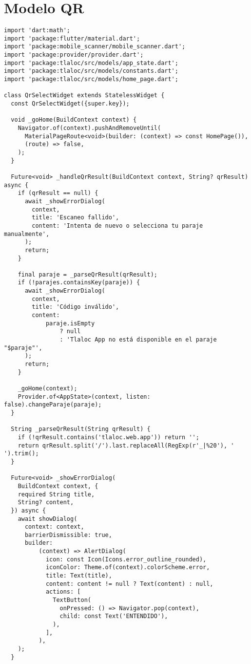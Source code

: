 \section{Modelo QR}
\label{anexo:alg11}
\begin{verbatim}
import 'dart:math';
import 'package:flutter/material.dart';
import 'package:mobile_scanner/mobile_scanner.dart';
import 'package:provider/provider.dart';
import 'package:tlaloc/src/models/app_state.dart';
import 'package:tlaloc/src/models/constants.dart';
import 'package:tlaloc/src/models/home_page.dart';

class QrSelectWidget extends StatelessWidget {
  const QrSelectWidget({super.key});

  void _goHome(BuildContext context) {
    Navigator.of(context).pushAndRemoveUntil(
      MaterialPageRoute<void>(builder: (context) => const HomePage()),
      (route) => false,
    );
  }

  Future<void> _handleQrResult(BuildContext context, String? qrResult) async {
    if (qrResult == null) {
      await _showErrorDialog(
        context,
        title: 'Escaneo fallido',
        content: 'Intenta de nuevo o selecciona tu paraje manualmente',
      );
      return;
    }

    final paraje = _parseQrResult(qrResult);
    if (!parajes.containsKey(paraje)) {
      await _showErrorDialog(
        context,
        title: 'Código inválido',
        content:
            paraje.isEmpty
                ? null
                : 'Tlaloc App no está disponible en el paraje "$paraje"',
      );
      return;
    }

    _goHome(context);
    Provider.of<AppState>(context, listen: false).changeParaje(paraje);
  }

  String _parseQrResult(String qrResult) {
    if (!qrResult.contains('tlaloc.web.app')) return '';
    return qrResult.split('/').last.replaceAll(RegExp(r'_|%20'), ' ').trim();
  }

  Future<void> _showErrorDialog(
    BuildContext context, {
    required String title,
    String? content,
  }) async {
    await showDialog(
      context: context,
      barrierDismissible: true,
      builder:
          (context) => AlertDialog(
            icon: const Icon(Icons.error_outline_rounded),
            iconColor: Theme.of(context).colorScheme.error,
            title: Text(title),
            content: content != null ? Text(content) : null,
            actions: [
              TextButton(
                onPressed: () => Navigator.pop(context),
                child: const Text('ENTENDIDO'),
              ),
            ],
          ),
    );
  }


\end{verbatim}
